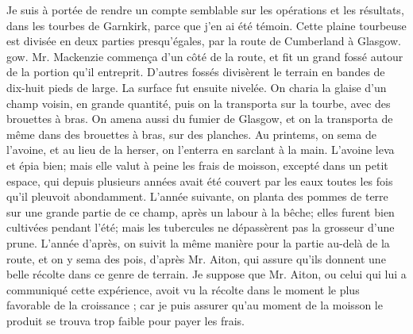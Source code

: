 Je suis à portée de rendre un compte semblable sur les opérations et les résultats, dans les tourbes de Garnkirk, parce que j'en ai été témoin. Cette plaine tourbeuse est divisée en deux parties presqu'égales, par la route de Cumberland à Glasgow.\setcounter{page}{459} gow. Mr. Mackenzie commença d'un côté de la route, et fit un grand fossé autour de la portion qu'il entreprit. D'autres fossés divisèrent le terrain en bandes de dix-huit pieds de large. La surface fut ensuite nivelée. On charia la glaise d'un champ voisin, en grande quantité, puis on la transporta sur la tourbe, avec des brouettes à bras. On amena aussi du fumier de Glasgow, et on la transporta de même dans des brouettes à bras, sur des planches. Au printems, on sema de l'avoine, et au lieu de la herser, on l'enterra en sarclant à la main. L'avoine leva et épia bien; mais elle valut à peine les frais de moisson, excepté dans un petit espace, qui depuis plusieurs années avait été couvert par les eaux toutes les fois qu'il pleuvoit abondamment. L'année suivante, on planta des pommes de terre sur une grande partie de ce champ, après un labour à la bêche; elles furent bien cultivées pendant l'été; mais les tubercules ne dépassèrent pas la grosseur d'une prune. L'année d'après, on suivit la même manière pour la partie au-delà de la route, et on y sema des pois, d'après Mr. Aiton, qui assure qu'ils donnent une belle récolte dans ce genre de terrain. Je suppose que Mr. Aiton, ou celui qui lui a communiqué cette expérience, avoit vu la\setcounter{page}{460} récolte dans le moment le plus favorable de la croissance ; car je puis assurer qu'au moment de la moisson le produit se trouva trop faible pour payer les frais.

